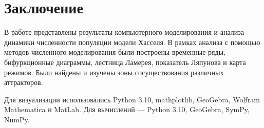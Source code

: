 \section{Заключение}

    В работе представлены результаты компьютерного моделирования и анализа динамики численности популяции модели Хасселя. В рамках анализа с помощью методов численного моделирования были построены временные ряды, бифуркционные диаграммы, лестница Ламерея, показатель Ляпунова и карта режимов. Были найдены и изучены зоны сосуществования различных аттракторов.

    Для визуализации использовались Python 3.10, mathplotlib, GeoGebra, Wolfram Mathematica и MatLab. Для вычислений --- Python 3.10, GeoGebra, SymPy, NumPy.

